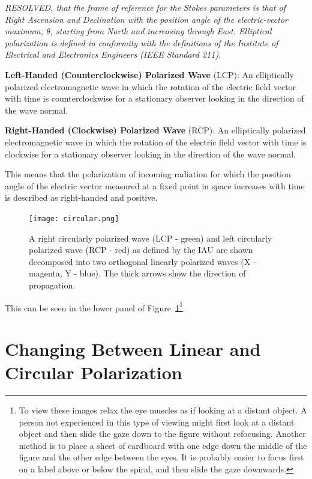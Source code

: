 \documentclass[letterpaper,11pt]{book}
\begin{document}
{\itshape RESOLVED, that the frame of reference for the Stokes parameters is
that of Right Ascension and Declination with the position angle of the
electric-vector maximum, $\theta$, starting from North and increasing through
East. Elliptical polarization is defined in conformity with the definitions of
the Institute of Electrical and Electronics Engineers
(IEEE Standard 211)}\cite{IEEE1969}.

{\bfseries Left-Handed (Counterclockwise) Polarized Wave} (LCP):
An elliptically polarized electromagnetic wave in which the
rotation of the electric field vector with time is
counterclockwise for a stationary observer looking in the
direction of the wave normal.

{\bfseries Right-Handed (Clockwise) Polarized Wave} (RCP): 
An elliptically polarized electromagnetic wave in which the
rotation of the electric field vector with time is clockwise
for a stationary observer looking in the direction of the wave
normal.

This means that the polarization of incoming radiation for which the position
angle of the electric vector measured at a fixed point in space
increases with time is described as right-handed and positive.
\begin{figure}[h!tb]
\begin{center}
\texttt{[image: circular.png]}
\caption[Circular Polarization]
{\label{fig:circ_pol} A right circularly polarized wave (LCP - green) and left
circularly polarized wave (RCP - red)
as defined by the IAU are shown decomposed into two
orthogonal linearly polarized waves (X - magenta, Y - blue). The thick arrows
show the direction of propagation.}
\end{center}
\end{figure}
This can be seen in the lower panel of Figure~\ref{fig:circ_pol}\footnote{To 
view these images relax the eye muscles as if
looking at a distant object. A person not experienced in this
type of viewing might first look at a distant object and then
slide the gaze down to the figure without refocusing. Another
method is to place a sheet of cardboard with one edge down the
middle of the figure and the other edge between the eyes. It is
probably easier to focus first on a label above or below
the spiral, and then slide the gaze downwards.}

\section{Changing Between Linear and Circular
Polarization}\label{sec:lin-circ}
\end{document}
